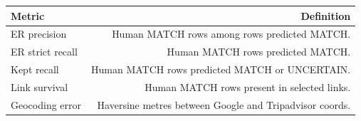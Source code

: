 \begin{tabular}{lr}
\toprule
Metric & Definition \\
\midrule
ER precision & Human MATCH rows among rows predicted MATCH. \\
ER strict recall & Human MATCH rows predicted MATCH. \\
Kept recall & Human MATCH rows predicted MATCH or UNCERTAIN. \\
Link survival & Human MATCH rows present in selected links. \\
Geocoding error & Haversine metres between Google and Tripadvisor coords. \\
\bottomrule
\end{tabular}
